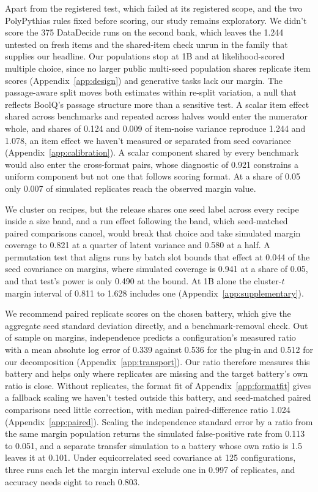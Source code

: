 Apart from the registered test, which failed at its registered scope, and the two PolyPythias rules fixed before scoring, our study remains exploratory. We didn't score the 375 DataDecide runs on the second bank, which leaves the 1.244 untested on fresh items and the shared-item check unrun in the family that supplies our headline. Our populations stop at 1B and at likelihood-scored multiple choice, since no larger public multi-seed population shares replicate item scores (Appendix~\ref{app:design}) and generative tasks lack our margin. The passage-aware split moves both estimates within re-split variation, a null that reflects BoolQ's passage structure more than a sensitive test. A scalar item effect shared across benchmarks and repeated across halves would enter the numerator whole, and shares of 0.124 and 0.009 of item-noise variance reproduce 1.244 and 1.078, an item effect we haven't measured or separated from seed covariance (Appendix~\ref{app:calibration}). A scalar component shared by every benchmark would also enter the cross-format pairs, whose diagnostic of 0.921 constrains a uniform component but not one that follows scoring format. At a share of 0.05 only 0.007 of simulated replicates reach the observed margin value.

We cluster on recipes, but the release shares one seed label across every recipe inside a size band, and a run effect following the band, which seed-matched paired comparisons cancel, would break that choice and take simulated margin coverage to 0.821 at a quarter of latent variance and 0.580 at a half. A permutation test that aligns runs by batch slot bounds that effect at 0.044 of the seed covariance on margins, where simulated coverage is 0.941 at a share of 0.05, and that test's power is only 0.490 at the bound. At 1B alone the cluster-$t$ margin interval of 0.811 to 1.628 includes one (Appendix~\ref{app:supplementary}).

We recommend paired replicate scores on the chosen battery, which give the aggregate seed standard deviation directly, and a benchmark-removal check. Out of sample on margins, independence predicts a configuration's measured ratio with a mean absolute log error of 0.339 against 0.536 for the plug-in and 0.512 for our decomposition (Appendix~\ref{app:transport}). Our ratio therefore measures this battery and helps only where replicates are missing and the target battery's own ratio is close. Without replicates, the format fit of Appendix~\ref{app:formatfit} gives a fallback scaling we haven't tested outside this battery, and seed-matched paired comparisons need little correction, with median paired-difference ratio 1.024 (Appendix~\ref{app:paired}). Scaling the independence standard error by a ratio from the same margin population returns the simulated false-positive rate from 0.113 to 0.051, and a separate transfer simulation to a battery whose own ratio is 1.5 leaves it at 0.101. Under equicorrelated seed covariance at 125 configurations, three runs each let the margin interval exclude one in 0.997 of replicates, and accuracy needs eight to reach 0.803.

